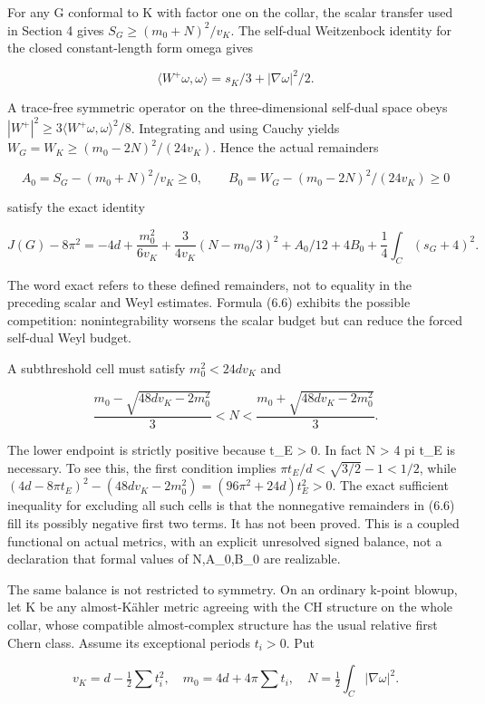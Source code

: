 \documentclass[
  10pt,
]{article}
\begin{document}
For any G conformal to K with factor one on the collar, the scalar
transfer used in Section 4 gives \(S_G\ge(m_0+N)^2/v_K\). The self-dual
Weitzenbock identity for the closed constant-length form omega gives

\[
 \langle W^+\omega,\omega\rangle=s_K/3+|\nabla\omega|^2/2.
\]

A trace-free symmetric operator on the three-dimensional self-dual space
obeys \(|W^+|^2\ge3\langle W^+\omega,\omega\rangle^2/8\). Integrating
and using Cauchy yields \(W_G=W_K\ge(m_0-2N)^2/(24v_K)\). Hence the
actual remainders

\[
 A_0=S_G-(m_0+N)^2/v_K\ge0,\qquad
 B_0=W_G-(m_0-2N)^2/(24v_K)\ge0
\]

satisfy the exact identity

\[
 \boxed{J(G)-8\pi^2
 =-4d+\frac{m_0^2}{6v_K}
    +\frac{3}{4v_K}(N-m_0/3)^2
    +A_0/12+4B_0+\frac14\int_C(s_G+4)^2.}                \tag{6.6}
\]

The word exact refers to these defined remainders, not to equality in
the preceding scalar and Weyl estimates. Formula (6.6) exhibits the
possible competition: nonintegrability worsens the scalar budget but can
reduce the forced self-dual Weyl budget.

A subthreshold cell must satisfy \(m_0^2<24dv_K\) and

\[
 \frac{m_0-\sqrt{48dv_K-2m_0^2}}3<N<
 \frac{m_0+\sqrt{48dv_K-2m_0^2}}3.                        \tag{6.7}
\]

The lower endpoint is strictly positive because t\_E \textgreater{} 0.
In fact N \textgreater{} 4 pi t\_E is necessary. To see this, the first
condition implies \(\pi t_E/d<\sqrt{3/2}-1<1/2\), while
\((4d-8\pi t_E)^2-(48dv_K-2m_0^2)=(96\pi^2+24d)t_E^2>0\). The exact
sufficient inequality for excluding all such cells is that the
nonnegative remainders in (6.6) fill its possibly negative first two
terms. It has not been proved. This is a coupled functional on actual
metrics, with an explicit unresolved signed balance, not a declaration
that formal values of N,A\_0,B\_0 are realizable.

The same balance is not restricted to symmetry. On an ordinary k-point
blowup, let K be any almost-Kähler metric agreeing with the CH structure
on the whole collar, whose compatible almost-complex structure has the
usual relative first Chern class. Assume its exceptional periods
\(t_i>0\). Put

\[
 v_K=d-\tfrac12\sum t_i^2,\quad m_0=4d+4\pi\sum t_i,
                   \quad N=\tfrac12\int_C|\nabla\omega|^2.
\]
\end{document}
